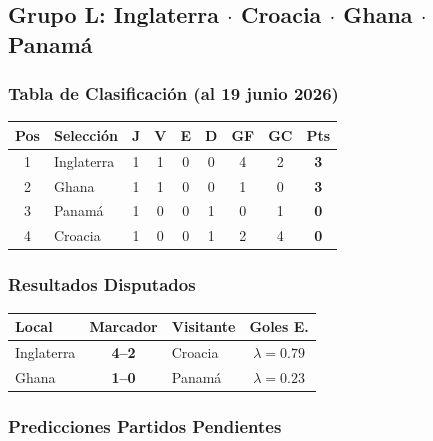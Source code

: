 \documentclass[11pt,a4paper]{article}
\begin{document}
\subsection{Grupo L: Inglaterra $\cdot$ Croacia $\cdot$ Ghana $\cdot$ Panamá}

\subsubsection*{Tabla de Clasificación (al 19 junio 2026)}


\begin{center}
\begin{tabular}{@{}clccccccc@{}}
\toprule
\textbf{Pos} & \textbf{Selección} & \textbf{J} & \textbf{V} & \textbf{E} & \textbf{D} & \textbf{GF} & \textbf{GC} & \textbf{Pts} \\
\midrule
  \cellcolor{green!25}1 & \cellcolor{green!25}Inglaterra & 1 & 1 & 0 & 0 & 4 & 2 & \textbf{3} \\
  \cellcolor{green!25}2 & \cellcolor{green!25}Ghana & 1 & 1 & 0 & 0 & 1 & 0 & \textbf{3} \\
  \cellcolor{yellow!20}3 & \cellcolor{yellow!20}Panamá & 1 & 0 & 0 & 1 & 0 & 1 & \textbf{0} \\
  4 & Croacia & 1 & 0 & 0 & 1 & 2 & 4 & \textbf{0} \\
\bottomrule
\end{tabular}
\end{center}

\subsubsection*{Resultados Disputados}

\begin{center}
\begin{tabular}{@{}lclc@{}}
\toprule
\textbf{Local} & \textbf{Marcador} & \textbf{Visitante} & \textbf{Goles E.} \\
\midrule
  Inglaterra & \textbf{4--2} & Croacia & $\lambda=0.79$ \\
  Ghana & \textbf{1--0} & Panamá & $\lambda=0.23$ \\
\bottomrule
\end{tabular}
\end{center}

\subsubsection*{Predicciones Partidos Pendientes}
\end{document}
